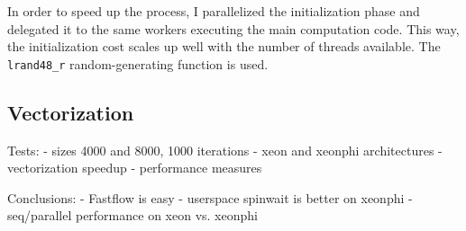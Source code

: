 \documentclass[a4paper,11pt]{article}
\newcommand{\code}[1]{\texttt{#1}}
\begin{document}
In order to speed up the process, I parallelized the initialization phase and delegated it to the same workers executing the main computation code. This way, the initialization cost scales up well with the number of threads available. The \code{lrand48\_r} random-generating function is used.

\subsection{Vectorization}



Tests:
- sizes 4000 and 8000, 1000 iterations
- xeon and xeonphi architectures
- vectorization speedup
- performance measures

Conclusions:
- Fastflow is easy
- userspace spinwait is better on xeonphi
- seq/parallel performance on xeon vs. xeonphi
\end{document}
